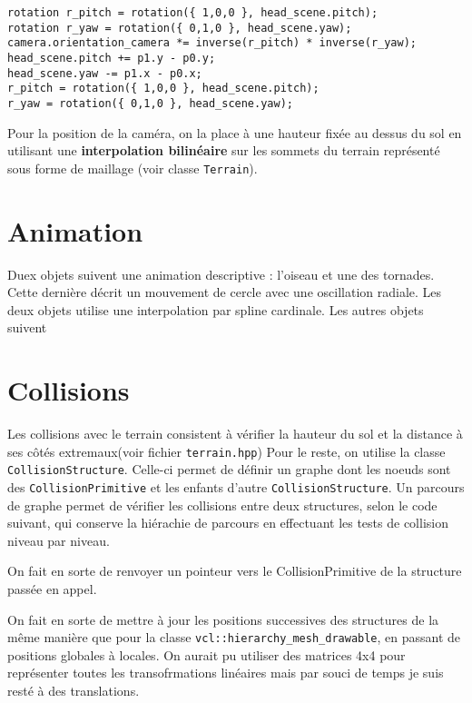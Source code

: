 \documentclass[10pt, a4paper]{article}
\theoremstyle{definition}
\begin{document}
\begin{lstlisting}
rotation r_pitch = rotation({ 1,0,0 }, head_scene.pitch);
rotation r_yaw = rotation({ 0,1,0 }, head_scene.yaw);
camera.orientation_camera *= inverse(r_pitch) * inverse(r_yaw);
head_scene.pitch += p1.y - p0.y;
head_scene.yaw -= p1.x - p0.x;
r_pitch = rotation({ 1,0,0 }, head_scene.pitch);
r_yaw = rotation({ 0,1,0 }, head_scene.yaw);
\end{lstlisting}

Pour la position de la caméra, on la place à une hauteur fixée au dessus du sol en utilisant une \textbf{interpolation bilinéaire} sur les sommets du terrain représenté sous forme de maillage (voir classe \texttt{Terrain}).

\section{Animation}
Duex objets suivent une animation descriptive : l'oiseau et une des tornades. Cette dernière décrit un mouvement de cercle avec une oscillation radiale. Les deux objets utilise une interpolation par spline cardinale. Les autres objets suivent 

\section{Collisions}
Les collisions avec le terrain consistent à vérifier la hauteur du sol et la distance à ses côtés extremaux(voir fichier \texttt{terrain.hpp})
\medbreak
Pour le reste, on utilise la classe \texttt{CollisionStructure}. Celle-ci permet de définir un graphe dont les noeuds sont des \texttt{CollisionPrimitive} et les enfants d'autre \texttt{CollisionStructure}. Un parcours de graphe permet de vérifier les collisions entre deux structures, selon le code suivant, qui conserve la hiérachie de parcours en effectuant les tests de collision niveau par niveau. 

On fait en sorte de renvoyer un pointeur vers le CollisionPrimitive de la structure passée en appel.

On fait en sorte de mettre à jour les positions successives des structures de la même manière que pour la classe \texttt{vcl::hierarchy\_mesh\_drawable}, en passant de positions globales à locales. On aurait pu utiliser des matrices 4x4 pour représenter toutes les transofrmations linéaires mais par souci de temps je suis resté à des translations.
\end{document}
